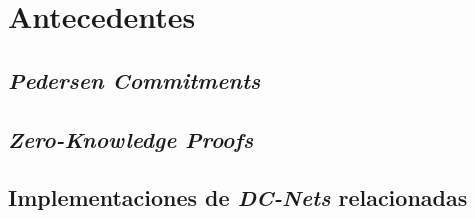 \chapter{Antecedentes}
\section{\emph{Pedersen Commitments}}
\section{\emph{Zero-Knowledge Proofs}}
\section{Implementaciones de \emph{DC-Nets} relacionadas}
